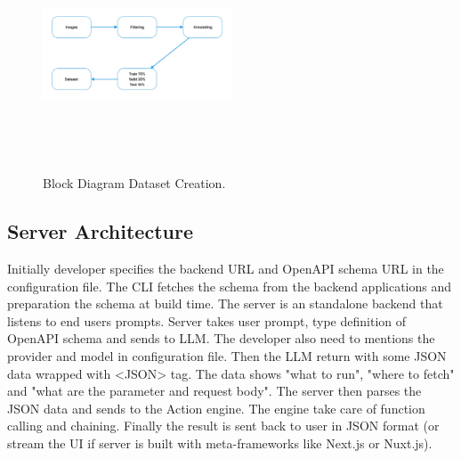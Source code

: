\documentclass[conference]{IEEEtran}
\begin{document}
\begin{figure}[htbp]
\centering
\includegraphics[width=0.5\textwidth, height=7cm]{images/block.jpeg}  %
\caption{Block Diagram Dataset Creation.}
\label{fig}
\end{figure}

\subsection{Server Architecture}
Initially developer specifies the backend URL and OpenAPI schema URL in the configuration file. The CLI fetches the schema from the backend applications and preparation the schema at build time. The server is an standalone backend that listens to end users prompts. Server takes user prompt, type definition of OpenAPI schema and sends to LLM. The developer also need to mentions the provider and model in configuration file. Then the LLM return with some JSON data wrapped with <JSON> tag. The data shows "what to run", "where to fetch" and "what are the parameter and request body". The server then parses the JSON data and sends to the Action engine. The engine take care of function calling and chaining. Finally the result is sent back to user in JSON format (or stream the UI if server is built with meta-frameworks like Next.js or Nuxt.js).
\end{document}
